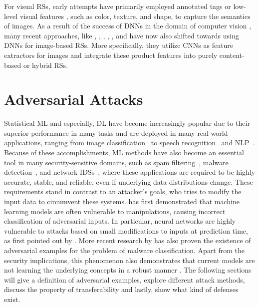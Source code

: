 For visual \acp{RS}, early attempts have primarily employed annotated tags \parencite{fan2008justclick} or low-level visual features \parencite{su2010efficient}, such as color, texture, and shape, to capture the semantics of images. As a result of the success of \acp{DNN} in the domain of computer vision \parencite{he2016deep}, many recent approaches, like \cite{mcauley2015image}, \cite{he2016vbpr}, \cite{bracher2016fashion}, \cite{kang2017visually}, \cite{shankar2017deep}, and \cite{tuinhof2018image} have now also shifted towards using \acp{DNN} for image-based \acp{RS}. More specifically, they utilize \acp{CNN} as feature extractors for images and integrate these product features into purely content-based or hybrid \acp{RS}.

\section{Adversarial Attacks}
Statistical \ac{ML} and especially, \ac{DL} have become increasingly popular due to their superior performance in many tasks and are deployed in many real-world applications, ranging from image classification~\parencite{krizhevsky2012imagenet, he2016deep} to speech recognition~\parencite{hinton2012deep} and \ac{NLP}~\parencite{devlin2018bert}. Because of these accomplishments, \ac{ML} methods have also become an essential tool in many security-sensitive domains, such as spam filtering~\parencite{guzella2009review}, malware detection~\parencite{sahs2012machine}, and network \acp{IDS}~\parencite{yin2017deep}, where these applications are required to be highly accurate, stable, and reliable, even if underlying data distributions change. These requirements stand in contrast to an attacker's goals, who tries to modify the input data to circumvent these systems. \cite{dalvi2004adversarial} has first demonstrated that machine learning models are often vulnerable to manipulations, causing incorrect classification of adversarial inputs. In particular, neural networks are highly vulnerable to attacks based on small modifications to inputs at prediction time, as first pointed out by \cite{szegedy2013intriguing}. More recent research by \cite{grosse2016adversarial} has also proven the existence of adversarial examples for the problem of malware classification. Apart from the security implications, this phenomenon also demonstrates that current models are not learning the underlying concepts in a robust manner \parencite{madry2017towards}. The following sections will give a definition of adversarial examples, explore different attack methods, discuss the property of transferability and lastly, show what kind of defenses exist.
